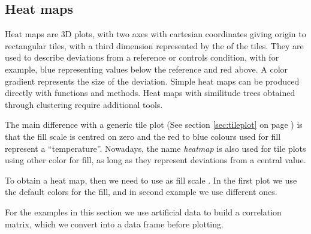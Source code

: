 \documentclass[krantz2]{krantz}\usepackage{knitr}%
\begin{document}
\subsection{Heat maps}\label{sec:plot:heatmap}
Heat maps are 3D plots, with two axes with cartesian coordinates giving origin to rectangular tiles, with a third dimension represented by the  of the tiles. They are used to describe deviations from a reference or controls condition, with for example, blue representing values below the reference and red above. A color gradient represents the size of the deviation. Simple heat maps can be produced directly with \ggplot functions and methods. Heat maps with similitude trees obtained through clustering require additional tools.

The main difference with a generic tile plot (See section \ref{sec:tileplot} on page \pageref{sec:tileplot}) is that the fill scale is centred on zero and the red to blue colours used for fill represent a ``temperature''. Nowadays, the name \emph{heatmap} is also used for tile plots using other color for fill, as long as they represent deviations from a central value.

\sloppy
To obtain a heat map, then we need to use as fill scale . In the first plot we use the default colors for the fill, and in second example we use different ones.

For the examples in this section we use artificial data to build a correlation matrix, which we convert into a data frame before plotting.

\begin{knitrout}\footnotesize
{}\color{fgcolor}\begin{kframe}
\begin{alltt}
\hlstd{(}\hlstd{)}
 \hlkwb{<-} \hlstd{(}\hlstd{(}\hlstd{),}  \hlstd{=} \hlstd{,}  \hlstd{=} \hlstd{)}
 \hlkwb{<-} \hlstd{(}\hlstd{(}\hlstd{),}  \hlstd{=} \hlstd{,}  \hlstd{=} \hlstd{)}
 \hlkwb{<-} 
 \hlkwb{<-} \hlstd{(} \hlstd{=} 
            \hlstd{=} \hlstd{(letters[}\hlopt{:}\hlstd{],} \hlstd{),}
            \hlstd{= LETTERS[}\hlstd{(}\hlopt{:}\hlstd{,} \hlstd{(}\hlstd{,} \hlstd{))])}
\end{alltt}
\end{kframe}
\end{knitrout}
\end{document}
